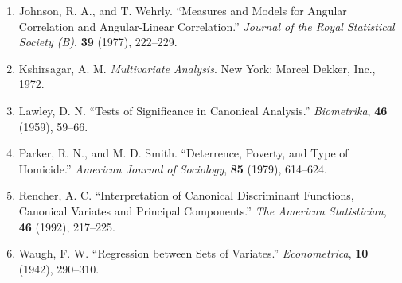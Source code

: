 
\begin{enumerate}[leftmargin=2.2em,itemsep=2pt,start=7]
\item Johnson, R. A., and T. Wehrly. “Measures and Models for Angular Correlation and Angular-Linear Correlation.” \textit{Journal of the Royal Statistical Society (B)}, \textbf{39} (1977), 222--229.
\item Kshirsagar, A. M. \textit{Multivariate Analysis}. New York: Marcel Dekker, Inc., 1972.
\item Lawley, D. N. “Tests of Significance in Canonical Analysis.” \textit{Biometrika}, \textbf{46} (1959), 59--66.
\item Parker, R. N., and M. D. Smith. “Deterrence, Poverty, and Type of Homicide.” \textit{American Journal of Sociology}, \textbf{85} (1979), 614--624.
\item Rencher, A. C. “Interpretation of Canonical Discriminant Functions, Canonical Variates and Principal Components.” \textit{The American Statistician}, \textbf{46} (1992), 217--225.
\item Waugh, F. W. “Regression between Sets of Variates.” \textit{Econometrica}, \textbf{10} (1942), 290--310.
\end{enumerate}
